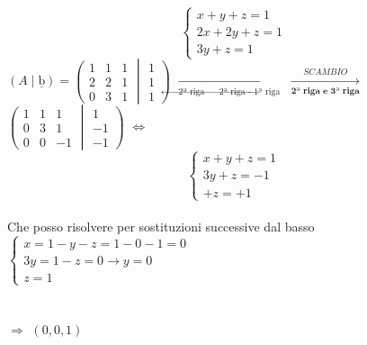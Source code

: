 \newpage
{} \\
\begin{equation*}
\begin{cases*}
x + y + z = 1 \\
2x + 2y + z = 1 \\
3y + z = 1
\end{cases*}
\end{equation*}
\(
(A\mid\underline{\text{b}}) =
	\left(
\begin{matrix}
	1 & 1  &  1\\
	2 &  2  &  1 \\
	0 &  3  & 1
\end{matrix}
\middle\vert
\begin{matrix}
	1 \\ 1 \\ 1
\end{matrix}
\right)
\)
$\underset{\text{2ª riga $\leftarrow$ 2ª riga - 1ª riga}}{\longrightarrow}$
$\underset{\textbf{2ª riga e 3ª riga}}{\overset{SCAMBIO}{\longrightarrow}}$
\(
	\left(
\begin{matrix}
	1 &  1  & 1\\
	0 &  3  & 1 \\
	0 &  0  & -1
\end{matrix}
\middle\vert
\begin{matrix}
	1 \\ -1 \\ -1
\end{matrix}
\right)
\)
$\Leftrightarrow$
\begin{equation*}
\begin{cases*}
x + y + z = 1 \\
3y + z = -1 \\
+z = +1
\end{cases*}
\end{equation*}\\
\centering\textsf{\small Che posso risolvere per sostituzioni successive dal basso} \\
\(
\begin{cases*}
	x = 1 - y - z = 1 - 0 - 1 = 0 \\
	3y = 1 - z = 0 \rightarrow y = 0 \\
	z = 1
\end{cases*}
\) \\
 \\  \\ $\Rightarrow$ 
\(
(0, 0, 1)
\) \vspace{.1cm}

